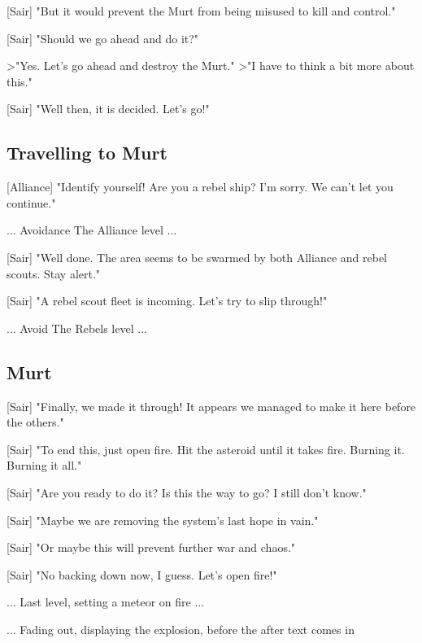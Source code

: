\documentclass[a4paper,12pt]{article}
\begin{document}
[Sair] "But it would prevent the Murt from being misused to kill and control."

[Sair] "Should we go ahead and do it?"

\textgreater "Yes. Let's go ahead and destroy the Murt."
\textgreater "I have to think a bit more about this."

[Sair] "Well then, it is decided. Let's go!"

\subsection{Travelling to Murt}

[Alliance] "Identify yourself! Are you a rebel ship? I'm sorry. We can't let you continue."

... Avoidance The Alliance level ...

[Sair] "Well done. The area seems to be swarmed by both Alliance and rebel scouts. Stay alert."

[Sair] "A rebel scout fleet is incoming. Let's try to slip through!"

... Avoid The Rebels level ...

\subsection{Murt}

[Sair] "Finally, we made it through! It appears we managed to make it here before the others."

[Sair] "To end this, just open fire. Hit the asteroid until it takes fire. Burning it. Burning it all."

[Sair] "Are you ready to do it? Is this the way to go? I still don't know."

[Sair] "Maybe we are removing the system's last hope in vain."

[Sair] "Or maybe this will prevent further war and chaos."

[Sair] "No backing down now, I guess. Let's open fire!"

... Last level, setting a meteor on fire ...

... Fading out, displaying the explosion, before the after text comes in
\end{document}

